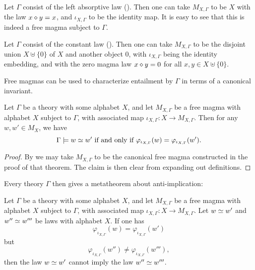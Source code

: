 \begin{example}\label{freeleft}
  Let $\Gamma$ consist of the left absorptive law (). Then one can take $M_{X,\Gamma}$ to be $X$ with the law $x \diamond y = x$, and $\iota_{X,\Gamma}$ to be the identity map. It is easy to see that this is indeed a free magma subject to $\Gamma$.
\end{example}

\begin{example}\label{freeconst}
  Let $\Gamma$ consist of the constant law (). Then one can take $M_{X,\Gamma}$ to be the disjoint union $X \uplus \{0\}$ of $X$ and another object $0$, with $\iota_{X,\Gamma}$ being the identity embedding, and with the zero magma law $x \diamond y = 0$ for all $x,y \in X \uplus \{0\}$.
\end{example}

Free magmas can be used to characterize entailment by $\Gamma$ in terms of a canonical invariant.

\begin{theorem}\label{canonical-invariant}
  Let $\Gamma$ be a theory with some alphabet $X$, and let $M_{X,\Gamma}$ be a free magma with alphabet $X$ subject to $\Gamma$, with associated map $\iota_{X,\Gamma}: X \to M_{X,\Gamma}$. Then for any $w,w' \in M_X$, we have
  \[
  \Gamma \models w \simeq w' \text{ if and only if } \varphi_{\iota_{X,\Gamma}}(w) = \varphi_{\iota_{X,\Gamma}}(w').
  \]
\end{theorem}

\begin{proof}
  By  we may take $M_{X,\Gamma}$ to be the canonical free magma constructed in the proof of that theorem. The claim is then clear from expanding out definitions.
\end{proof}

Every theory $\Gamma$ then gives a metatheorem about anti-implication:

\begin{corollary}\label{anti-impl}
  Let $\Gamma$ be a theory with some alphabet $X$, and let $M_{X,\Gamma}$ be a free magma with alphabet $X$ subject to $\Gamma$, with associated map $\iota_{X,\Gamma}: X \to M_{X,\Gamma}$. Let $w \simeq w'$ and $w'' \simeq w'''$ be laws with alphabet $X$. If one has
  \[
  \varphi_{\iota_{X,\Gamma}}(w) = \varphi_{\iota_{X,\Gamma}}(w')
  \]
  but
  \[
  \varphi_{\iota_{X,\Gamma}}(w'') \neq \varphi_{\iota_{X,\Gamma}}(w'''),
  \]
  then the law $w \simeq w'$ cannot imply the law $w'' \simeq w'''$.
\end{corollary}

